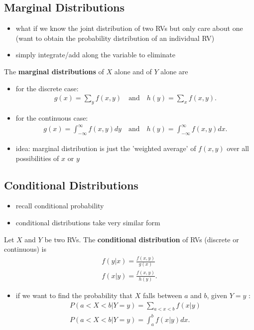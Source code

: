 \documentclass[10pt]{article}
\begin{document}
\subsection{Marginal Distributions}
\begin{itemize}
    \item what if we know the joint distribution of two RVs but only care about one (want to obtain the probability distribution of an individual RV)
    \item simply integrate/add along the variable to eliminate
\end{itemize}
\begin{definition}
    The \textbf{marginal distributions} of $X$ alone and of $Y$ alone are 
    \begin{itemize}
        \item for the discrete case:
            \begin{align*}
                g(x) = \sum_{y} f(x,y) \quad \text{and} \quad h(y) = \sum_{x} f(x,y)
            .\end{align*}
        \item for the continuous case:
            \begin{align*}
                g(x) = \int_{-\infty}^{\infty} f(x,y) dy \quad \text{and} \quad h(y) = \int_{-\infty}^{\infty} f(x,y) dx  
            .\end{align*}
    \end{itemize}
\end{definition}
\begin{itemize}
    \item idea: marginal distribution is just the 'weighted average' of $f(x,y)$ over all possibilities of $x$ or $y$
\end{itemize}

\subsection{Conditional Distributions}
\begin{itemize}
    \item recall conditional probability
    \item conditional distributions take very similar form
\end{itemize}
\begin{definition}
    Let $X$ and $Y$ be two RVs. The \textbf{conditional distribution} of RVs (discrete or continuous) is
    \begin{gather*}
        f(y|x) = \frac{f(x,y)}{g(x)} \\ 
        f(x|y) = \frac{f(x,y)}{h(y)}
    .\end{gather*}
\end{definition}
\begin{itemize}
    \item if we want to find the probability that $X$ falls between $a$ and $b$, given $Y = y$ :
        \begin{gather*}
            P(a<X<b | Y=y) = \sum_{a<x<b} f(x|y) \\ 
            P(a<X<b | Y=y) = \int_{a}^{b} f(x|y) dx
        .\end{gather*}
\end{itemize}
\end{document}
